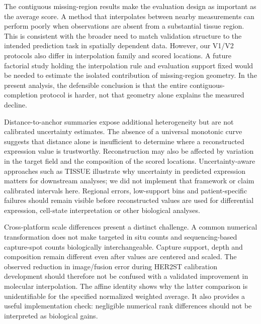 The contiguous missing-region results make the evaluation design as important as the average score. A method that interpolates between nearby measurements can perform poorly when observations are absent from a substantial tissue region. This is consistent with the broader need to match validation structure to the intended prediction task in spatially dependent data\cite{roberts2017}. However, our V1/V2 protocols also differ in interpolation family and scored locations. A future factorial study holding the interpolation rule and evaluation support fixed would be needed to estimate the isolated contribution of missing-region geometry. In the present analysis, the defensible conclusion is that the entire contiguous-completion protocol is harder, not that geometry alone explains the measured decline.

Distance-to-anchor summaries expose additional heterogeneity but are not calibrated uncertainty estimates. The absence of a universal monotonic curve suggests that distance alone is insufficient to determine where a reconstructed expression value is trustworthy. Reconstruction may also be affected by variation in the target field and the composition of the scored locations. Uncertainty-aware approaches such as TISSUE illustrate why uncertainty in predicted expression matters for downstream analyses\cite{sun2024}; we did not implement that framework or claim calibrated intervals here. Regional errors, low-support bins and patient-specific failures should remain visible before reconstructed values are used for differential expression, cell-state interpretation or other biological analyses.

Cross-platform scale differences present a distinct challenge. A common numerical transformation does not make targeted in situ counts and sequencing-based capture-spot counts biologically interchangeable. Capture support, depth and composition remain different even after values are centered and scaled. The observed reduction in image/fusion error during HER2ST calibration development should therefore not be confused with a validated improvement in molecular interpolation. The affine identity shows why the latter comparison is unidentifiable for the specified normalized weighted average. It also provides a useful implementation check: negligible numerical rank differences should not be interpreted as biological gains.

